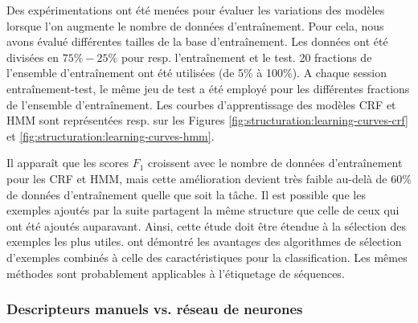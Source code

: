 Des expérimentations ont été menées pour évaluer les variations des modèles lorsque l'on augmente le nombre de données d'entraînement. Pour cela, nous avons évalué différentes tailles de la base d'entraînement. Les données ont été divisées en $75\%-25\%$ pour resp. l'entraînement et le test. 20 fractions de l'ensemble d'entraînement ont été utilisées  (de 5\% à 100\%). A chaque session entraînement-test, le même jeu de test a été employé pour les différentes fractions de l'ensemble d'entraînement. Les courbes d'apprentissage des modèles CRF et HMM sont représentées resp. sur les Figures \ref{fig:structuration:learning-curves-crf} et \ref{fig:structuration:learning-curves-hmm}. 



Il apparaît que les scores $F_1$ croissent avec le nombre de données d'entraînement pour les CRF et HMM, mais cette amélioration devient très faible au-delà de 60\% de données d'entraînement quelle que soit la tâche. Il est possible que les exemples ajoutés par la suite partagent la même structure que celle de ceux qui ont été ajoutés auparavant. Ainsi, cette étude doit être étendue à la sélection des exemples les plus utiles. \citet{raman2003exampleSelection} ont démontré les avantages des algorithmes de sélection d'exemples combinés à celle des caractéristiques pour la classification. Les mêmes méthodes sont probablement applicables à l'étiquetage de séquences.



\subsubsection{Descripteurs manuels vs. réseau de neurones}

